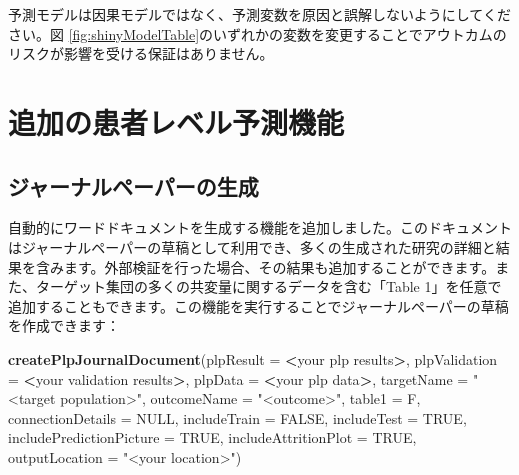 \documentclass[
  11pt]{book}
\makeatletter
\newenvironment{Shaded}{\begin{snugshade}}{\end{snugshade}}
\newcommand{\AttributeTok}[1]{\textcolor[rgb]{0.13,0.29,0.53}{#1}}
\newcommand{\ConstantTok}[1]{\textcolor[rgb]{0.56,0.35,0.01}{#1}}
\newcommand{\FunctionTok}[1]{\textcolor[rgb]{0.13,0.29,0.53}{\textbf{#1}}}
\newcommand{\NormalTok}[1]{#1}
\newcommand{\SpecialCharTok}[1]{\textcolor[rgb]{0.81,0.36,0.00}{\textbf{#1}}}
\newcommand{\StringTok}[1]{\textcolor[rgb]{0.31,0.60,0.02}{#1}}
\newenvironment{kframe}{%
\medskip{}
\setlength{\fboxsep}{.8em}
 \def\at@end@of@kframe{}%
 \ifinner\ifhmode%
  \def\at@end@of@kframe{\end{minipage}}%
  \begin{minipage}{\columnwidth}%
 \fi\fi%
 \def\FrameCommand##1{\hskip\@totalleftmargin \hskip-\fboxsep
 \colorbox{myShadeColor}{##1}\hskip-\fboxsep
     \hskip-\linewidth \hskip-\@totalleftmargin \hskip\columnwidth}%
 \MakeFramed {\advance\hsize-\width
   \@totalleftmargin\z@ \linewidth\hsize
   \@setminipage}}%
 {\par\unskip\endMakeFramed%
 \at@end@of@kframe}
\newenvironment{rmdblock}[1]
  {
  \begin{itemize}
  \renewcommand{\labelitemi}{
    \raisebox{-.7\height}[0pt][0pt]{
      {\setkeys{Gin}{width=3em,keepaspectratio}\texttt{[image: images/\#1]}}
    }
  }
  \setlength{\fboxsep}{1em}
  \begin{kframe}
  \item
  }
  {
  \end{kframe}
  \end{itemize}
  }
\newenvironment{rmdimportant}
  {\begin{rmdblock}{important}}
  {\end{rmdblock}}
\theoremstyle{definition}
\theoremstyle{definition}
\theoremstyle{definition}
\theoremstyle{definition}
\theoremstyle{remark}
\makeatother
\begin{document}
\begin{rmdimportant}
予測モデルは因果モデルではなく、予測変数を原因と誤解しないようにしてください。図 \ref{fig:shinyModelTable}のいずれかの変数を変更することでアウトカムのリスクが影響を受ける保証はありません。
\end{rmdimportant}

\section{追加の患者レベル予測機能}\label{ux8ffdux52a0ux306eux60a3ux8005ux30ecux30d9ux30ebux4e88ux6e2cux6a5fux80fd}

\subsection{ジャーナルペーパーの生成}\label{ux30b8ux30e3ux30fcux30caux30ebux30daux30fcux30d1ux30fcux306eux751fux6210}

自動的にワードドキュメントを生成する機能を追加しました。このドキュメントはジャーナルペーパーの草稿として利用でき、多くの生成された研究の詳細と結果を含みます。外部検証を行った場合、その結果も追加することができます。また、ターゲット集団の多くの共変量に関するデータを含む「Table 1」を任意で追加することもできます。この機能を実行することでジャーナルペーパーの草稿を作成できます：

\begin{Shaded}
\begin{Highlighting}[]
 \FunctionTok{createPlpJournalDocument}\NormalTok{(}\AttributeTok{plpResult =} \SpecialCharTok{\textless{}}\NormalTok{your plp results}\SpecialCharTok{\textgreater{}}\NormalTok{,}
             \AttributeTok{plpValidation =} \SpecialCharTok{\textless{}}\NormalTok{your validation results}\SpecialCharTok{\textgreater{}}\NormalTok{,}
             \AttributeTok{plpData =} \SpecialCharTok{\textless{}}\NormalTok{your plp data}\SpecialCharTok{\textgreater{}}\NormalTok{,}
             \AttributeTok{targetName =} \StringTok{"\textless{}target population\textgreater{}"}\NormalTok{,}
             \AttributeTok{outcomeName =} \StringTok{"\textless{}outcome\textgreater{}"}\NormalTok{,}
             \AttributeTok{table1 =}\NormalTok{ F,}
             \AttributeTok{connectionDetails =} \ConstantTok{NULL}\NormalTok{,}
             \AttributeTok{includeTrain =} \ConstantTok{FALSE}\NormalTok{,}
             \AttributeTok{includeTest =} \ConstantTok{TRUE}\NormalTok{,}
             \AttributeTok{includePredictionPicture =} \ConstantTok{TRUE}\NormalTok{,}
             \AttributeTok{includeAttritionPlot =} \ConstantTok{TRUE}\NormalTok{,}
             \AttributeTok{outputLocation =} \StringTok{"\textless{}your location\textgreater{}"}\NormalTok{)}
\end{Highlighting}
\end{Shaded}
\end{document}
